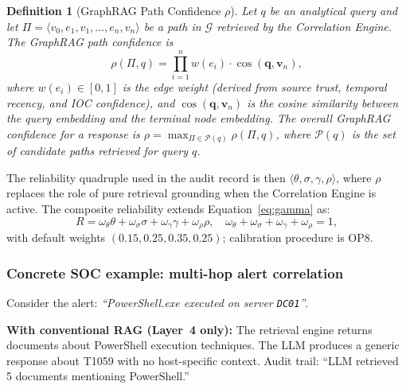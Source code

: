 \documentclass[preprint,12pt,authoryear]{elsarticle}
\newtheorem{definition}{Definition}
\begin{document}
\begin{definition}[GraphRAG Path Confidence $\rho$]
\label{def:graphrag}
Let $q$ be an analytical query and let
$\Pi = \langle v_0, e_1, v_1, \dots, e_n, v_n \rangle$
be a path in $\mathcal{G}$ retrieved by the Correlation Engine.
The GraphRAG path confidence is
\begin{equation}
  \rho(\Pi, q) = \prod_{i=1}^{n} w(e_i) \cdot \cos(\mathbf{q}, \mathbf{v}_n),
  \label{eq:rho}
\end{equation}
where $w(e_i) \in [0,1]$ is the edge weight (derived from source trust,
temporal recency, and IOC confidence), and
$\cos(\mathbf{q}, \mathbf{v}_n)$ is the cosine similarity between the query embedding
and the terminal node embedding.
The overall GraphRAG confidence for a response is
$\rho = \max_{\Pi \in \mathcal{P}(q)} \rho(\Pi, q)$,
where $\mathcal{P}(q)$ is the set of candidate paths retrieved for query $q$.
\end{definition}

The reliability quadruple used in the audit record is then
$\langle\theta, \sigma, \gamma, \rho\rangle$, where $\rho$ replaces the
role of pure retrieval grounding when the Correlation Engine is active.
The composite reliability extends Equation~\eqref{eq:gamma} as:
\begin{equation}
  R = \omega_\theta\theta + \omega_\sigma\sigma + \omega_\gamma\gamma
    + \omega_\rho\rho,
  \quad \omega_\theta + \omega_\sigma + \omega_\gamma + \omega_\rho = 1,
  \label{eq:R_v4}
\end{equation}
with default weights $(0.15, 0.25, 0.35, 0.25)$; calibration procedure is OP8.

\subsubsection{Concrete SOC example: multi-hop alert correlation}

Consider the alert: \emph{``PowerShell.exe executed on server \texttt{DC01}''}.

\noindent\textbf{With conventional RAG (Layer~4 only):}
The retrieval engine returns documents about PowerShell execution techniques.
The LLM produces a generic response about T1059 with no host-specific context.
Audit trail: ``LLM retrieved 5 documents mentioning PowerShell.''
\end{document}
